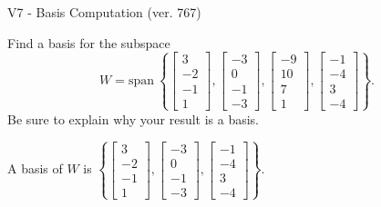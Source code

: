 \begin{exercise}
  \begin{exerciseTitle}V7 - Basis Computation (ver. 767)\end{exerciseTitle}
  \begin{exerciseStatement}
    Find a basis for the subspace 
\[W=\mathrm{span}\ \left\{\left[\begin{array}{r}
3 \\
-2 \\
-1 \\
1
\end{array}\right] , \left[\begin{array}{r}
-3 \\
0 \\
-1 \\
-3
\end{array}\right] , \left[\begin{array}{r}
-9 \\
10 \\
7 \\
1
\end{array}\right] , \left[\begin{array}{r}
-1 \\
-4 \\
3 \\
-4
\end{array}\right]\right\}.\]
 Be sure to explain why your result is a basis.


  \end{exerciseStatement}
  \begin{exerciseAnswer}
   A basis of \(W\) is  \(\left\{\left[\begin{array}{r}
3 \\
-2 \\
-1 \\
1
\end{array}\right] , \left[\begin{array}{r}
-3 \\
0 \\
-1 \\
-3
\end{array}\right] , \left[\begin{array}{r}
-1 \\
-4 \\
3 \\
-4
\end{array}\right]\right\}\).
  


  \end{exerciseAnswer}
\end{exercise}